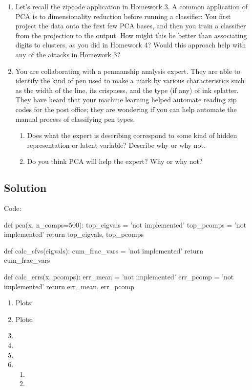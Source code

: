 \documentclass[submit]{harvardml}
\begin{document}
\begin{problem}
\begin{enumerate}
\item Let's recall the zipcode application in Homework 3.  A common
  application of PCA is to dimensionality reduction before running a
  classifier: You first project the data onto the first few PCA bases,
  and then you train a classifier from the projection to the output.
  How might this be better than associating digits to clusters, as you
  did in Homework 4?  Would this approach help with any of the attacks
  in Homework 3?

\item You are collaborating with a penmanship analysis expert.  They
  are able to identify the kind of pen used to make a mark by various
  characteristics such as the width of the line, its crispness, and
  the type (if any) of ink splatter.  They have heard that your
  machine learning helped automate reading zip codes for the post
  office; they are wondering if you can help automate the manual
  process of classifying pen types.
  \begin{enumerate}
    \item Does what the expert is describing correspond to some kind
      of hidden representation or latent variable?  Describe why or
      why not.
    \item Do you think PCA will help the expert?  Why or why not?
      
  \end{enumerate}
\end{enumerate}
\end{problem}

\subsection*{Solution}
Code:

\begin{python}
def pca(x, n_comps=500):
    top_eigvals = 'not implemented'
    top_pcomps = 'not implemented'
    return top_eigvals, top_pcomps


def calc_cfvs(eigvals):
    cum_frac_vars = 'not implemented'
    return cum_frac_vars


def calc_errs(x, pcomps):
    err_mean = 'not implemented'
    err_pcomp = 'not implemented'
    return err_mean, err_pcomp
\end{python}

\begin{enumerate}
  \item Plots:
  \item Plots:
  \item 
  \item 
  \item 
  \item \begin{enumerate}
      \item 
      \item
  \end{enumerate}
\end{enumerate}
\end{document}
